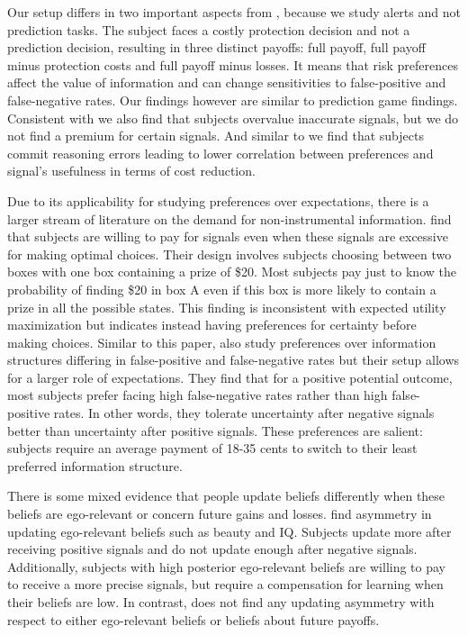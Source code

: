 \documentclass[12pt,a4paper]{article}
\begin{document}
Our setup differs in two important aspects from \citep*{ambuehl_belief_2018, xu_revealed_2022}, because we study alerts and not prediction tasks. The subject faces a costly protection decision and not a prediction decision, resulting in three distinct payoffs: full payoff, full payoff minus protection costs and full payoff minus losses. It means that risk preferences affect the value of information and can change sensitivities to false-positive and false-negative rates. Our findings however are similar to prediction game findings. Consistent with \citet{ambuehl_belief_2018} we also find that subjects overvalue inaccurate signals, but we do not find a premium for certain signals.  And similar to \citet{xu_revealed_2022} we find that subjects commit reasoning errors leading to lower correlation between preferences and signal's usefulness in terms of cost reduction.

Due to its applicability for studying preferences over expectations, there is a larger stream of literature on the demand for non-instrumental information. \citet{eliaz_paying_2010} find that subjects are willing to pay for signals even when these signals are excessive for making optimal choices. Their design involves subjects choosing between two boxes with one box containing a prize of \$20. Most subjects pay just to know the probability of finding \$20 in box A even if this box is more likely to contain a prize in all the possible states. This finding is inconsistent with expected utility maximization but indicates instead having preferences for certainty before making choices.  Similar to this paper, \citet{masatlioglu_intrinsic_2017} also study preferences over information structures differing in false-positive and false-negative rates but their setup allows for a larger role of expectations. They find that for a positive potential outcome, most subjects prefer facing high false-negative rates rather than high false-positive rates. In other words, they tolerate uncertainty after negative signals better than uncertainty after positive signals. These preferences are salient: subjects require an average payment of 18-35 cents to switch to their least preferred information structure.

There is some mixed evidence that people update beliefs differently when these beliefs are ego-relevant or concern future gains and losses. \citet{eil_good_2011} find asymmetry in updating ego-relevant beliefs such as beauty and IQ. Subjects update more after receiving positive signals and do not update enough after negative signals. Additionally, subjects with high posterior ego-relevant beliefs are willing to pay to receive a more precise signals, but require a compensation for learning when their beliefs are low. In contrast, \citet{coutts_good_2019} does not find any updating asymmetry with respect to either ego-relevant beliefs or beliefs about future payoffs. 
\end{document}
